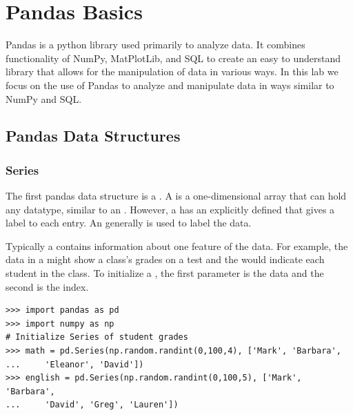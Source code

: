 \label{lab:pandas1}

\section*{Pandas Basics}

Pandas is a python library used primarily to analyze data.
It combines functionality of NumPy, MatPlotLib, and SQL to create an easy to understand library that allows for the manipulation of data in various ways.
In this lab we focus on the use of Pandas to analyze and manipulate data in ways similar to NumPy and SQL.

\subsection*{Pandas Data Structures}

\subsubsection*{Series}

The first pandas data structure is a .
A  is a one-dimensional array that can hold any datatype, similar to an .
However, a  has an explicitly defined  that gives a label to each entry.
An  generally is used to label the data.

Typically a  contains information about one feature of the data.
For example, the data in a  might show a class's grades on a test and the  would indicate each student in the class.
To initialize a , the first parameter is the data and the second is the index.

\begin{lstlisting}
>>> import pandas as pd
>>> import numpy as np
# Initialize Series of student grades
>>> math = pd.Series(np.random.randint(0,100,4), ['Mark', 'Barbara',
...		'Eleanor', 'David'])
>>> english = pd.Series(np.random.randint(0,100,5), ['Mark', 'Barbara',
...		'David', 'Greg', 'Lauren'])
\end{lstlisting}

